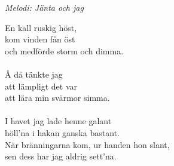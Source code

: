 {\footnotesize\textit{Melodi: Jänta och jag}}\par
\vspace{10pt}
En kall ruskig höst,\\
kom vinden fån öst\\
och medförde storm och dimma.\\
\\
Å då tänkte jag\\
att lämpligt det var\\
att lära min svärmor simma.\\
\\
I havet jag lade henne galant\\
höll'na i hakan ganska bastant.\\
När bränningarna kom, ur handen hon slant,\\
sen dess har jag aldrig sett'na.
